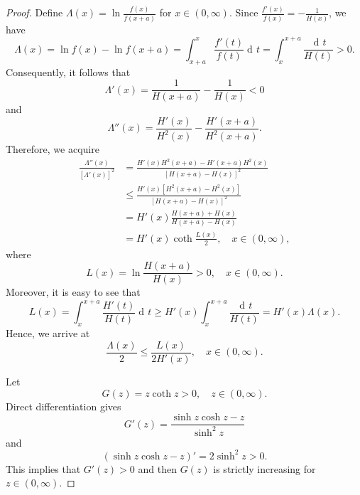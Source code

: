 \documentclass[reqno]{amsart}%
\theoremstyle{plain}
\theoremstyle{remark}
\DeclareMathOperator{\td}{d\!}
\begin{document}
\begin{proof}
Define $\Lambda(x)=\ln\frac{f(x)}{f(x+a)}$ for $x\in(0,\infty)$.
Since $\frac{f'(x)}{f(x)}=-\frac1{H(x)}$, we have
$$
\Lambda(x)=\ln f(x)-\ln f(x+a)
=\int_{x+a}^{x}\frac{f'(t)}{f(t)}\td t
=
\int_x^{x+a}\frac{\td t}{H(t)}>0.
$$
Consequently, it follows that
$$
\Lambda'(x)=\frac1{H(x+a)}-\frac1{H(x)}<0
$$
and
$$
\Lambda''(x)
=\frac{H'(x)}{H^2(x)}-\frac{H'(x+a)}{H^2(x+a)}.
$$
Therefore, we acquire
\begin{equation}\label{eq:lambda-bound}
\begin{aligned}
\frac{\Lambda''(x)}{[\Lambda'(x)]^2}
&=\frac{H'(x)H^2(x+a)-H'(x+a)H^2(x)}{[H(x+a)-H(x)]^2}\\
&\leq \frac{H'(x)[H^2(x+a)-H^2(x)]}{[H(x+a)-H(x)]^2}\\
&=H'(x)\frac{H(x+a)+H(x)}{H(x+a)-H(x)}\\
&=H'(x)\coth\frac{L(x)}{2}, \quad x\in(0,\infty),
\end{aligned}
\end{equation}
where
$$
L(x)=\ln\frac{H(x+a)}{H(x)}>0, \quad x\in(0,\infty).
$$
Moreover, it is easy to see that
$$
L(x)=\int_x^{x+a}\frac{H'(t)}{H(t)}\td t
\geq H'(x)\int_x^{x+a}\frac{\td t}{H(t)}
=H'(x)\Lambda(x).
$$
Hence, we arrive at
\begin{equation}\label{LL-ineq}
\frac{\Lambda(x)}{2}\leq\frac{L(x)}{2H'(x)}, \quad x\in(0,\infty).
\end{equation}
\par
Let
$$
G(z)=z\coth z>0, \quad z\in(0,\infty).
$$
Direct differentiation gives
$$
G'(z)=\frac{\sinh z\cosh z-z}{\sinh^2z}
$$
and
$$
(\sinh z\cosh z-z)'=2\sinh^2z>0.
$$
This implies that $G'(z)>0$ and then $G(z)$ is strictly increasing for $z\in(0,\infty)$.


\end{proof}
\end{document}
